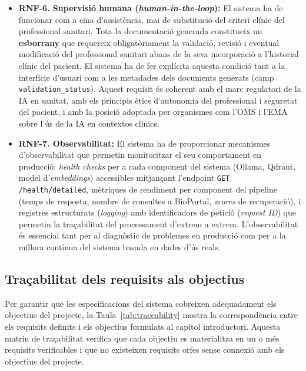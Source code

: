 \documentclass[CAT]{TFUOC}%
\begin{document}
\begin{itemize}
    \item \textbf{RNF-6. Supervisió humana (\textit{human-in-the-loop}):} El sistema ha de funcionar com a eina d'assistència, mai de substitució del criteri clínic del professional sanitari. Tota la documentació generada constitueix un \textbf{esborrany} que requereix obligatòriament la validació, revisió i eventual modificació del professional sanitari abans de la seva incorporació a l'historial clínic del pacient. El sistema ha de fer explícita aquesta condició tant a la interfície d'usuari com a les metadades dels documents generats (camp \texttt{validation\_status}). Aquest requisit és coherent amb el marc regulatori de la IA en sanitat, amb els principis ètics d'autonomia del professional i seguretat del pacient, i amb la posició adoptada per organismes com l'OMS i l'EMA sobre l'ús de la IA en contextos clínics.

    \item \textbf{RNF-7. Observabilitat:} El sistema ha de proporcionar mecanismes d'observabilitat que permetin monitoritzar el seu comportament en producció: \textit{health checks} per a cada component del sistema (Ollama, Qdrant, model d'\textit{embeddings}) accessibles mitjançant l'endpoint \texttt{GET /health/detailed}, mètriques de rendiment per component del pipeline (temps de resposta, nombre de consultes a BioPortal, \textit{scores} de recuperació), i registres estructurats (\textit{logging}) amb identificadors de petició (\textit{request ID}) que permetin la traçabilitat del processament d'extrem a extrem. L'observabilitat és essencial tant per al diagnòstic de problemes en producció com per a la millora contínua del sistema basada en dades d'ús reals.
\end{itemize}

\subsection{Traçabilitat dels requisits als objectius}

Per garantir que les especificacions del sistema cobreixen adequadament els objectius del projecte, la Taula~\ref{tab:traceability} mostra la correspondència entre els requisits definits i els objectius formulats al capítol introductori. Aquesta matriu de traçabilitat verifica que cada objectiu es materialitza en un o més requisits verificables i que no existeixen requisits orfes sense connexió amb els objectius del projecte.
\end{document}
